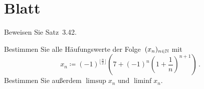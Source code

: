 \section{Blatt}

\begin{aufg}[6 Punkte]
Beweisen Sie Satz~3.42.
\end{aufg}

\bigskip

\begin{lsg}
\end{lsg}

\bigskip


\begin{aufg}[6 Punkte]
Bestimmen Sie alle H\"aufungswerte der Folge~$(x_n)_{n\in\mathbb{N}}$ mit 
\[
 x_n \coloneqq (-1)^{\lfloor \frac{n}{2}\rfloor} \left( 7 + (-1)^n\left(1+\frac1n\right)^{n+1} \right)\,. 
\]
Bestimmen Sie au{\ss}erdem $\limsup x_n$ und $\liminf x_n$.
\end{aufg}

\bigskip

